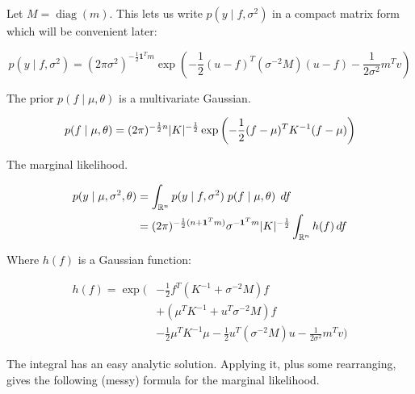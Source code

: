 \documentclass{article}
\newcommand{\dif}{\mathop{}\!{d}}
\newcommand{\one}{\mathbf{1}}
\newcommand{\real}{\mathbb{R}}
\DeclareMathOperator{\diag}{diag}
\DeclarePairedDelimiter{\Det}{\lvert}{\rvert}
\begin{document}
Let $M = \diag(m)$.
This lets us write $p(y \mid f, \sigma^2)$ in a compact matrix form which will be convenient later:

\begin{equation}
    p(y \mid f, \sigma^2)
    =
    (2 \pi \sigma^2)^{-\frac{1}{2} \one^T m}
    \exp \left(
        -\frac{1}{2} (u - f)^T (\sigma^{-2} M) (u - f)
        -\frac{1}{2 \sigma^2} m^T v
    \right)
\end{equation}

The prior $p(f \mid \mu, \theta)$ is a multivariate Gaussian.

\begin{equation}
    p(f \mid \mu, \theta)
    =
    (2 \pi)^{-\frac{1}{2} n}
    \Det{K}^{-\frac{1}{2}}
    \exp \left(
        -\frac{1}{2} (f - \mu)^T K^{-1} (f - \mu)
    \right)
\end{equation}

The marginal likelihood.

\begin{align}
    p(y \mid \mu, \sigma^2, \theta)
    &=
    \int_{\real^n}
    p(y \mid f, \sigma^2) \;
    p(f \mid \mu, \theta) \;
    \dif f
    \\ &=
    (2 \pi)^{-\frac{1}{2} (n + \one^T m)}
    \sigma^{-\one^T m}
    \Det{K}^{-\frac{1}{2}}
    \int_{\real^n} h(f) \dif f
\end{align}

Where $h(f)$ is a Gaussian function:

\begin{equation}
    \begin{split}
        h(f) = \exp \biggl(
            & 
            - \frac{1}{2} f^T (K^{-1} + \sigma^{-2} M) f
            \\ &
            + (\mu^T K^{-1} + u^T \sigma^{-2} M) f
            \\ &
            - \frac{1}{2} \mu^T K^{-1} \mu
            - \frac{1}{2} u^T (\sigma^{-2} M) u
            - \frac{1}{2\sigma^2} m^T v
        \biggr)
    \end{split}
\end{equation}

The integral has an easy analytic solution.
Applying it, plus some rearranging, gives the following (messy) formula for the marginal likelihood.
\end{document}
